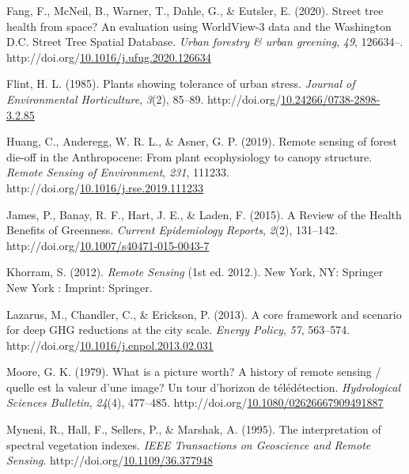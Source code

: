 \documentclass[12pt,twoside]{reedthesis}
\newlength{\cslhangindent}
\newenvironment{CSLReferences}[2] %
 {%
  \setlength{\parindent}{0pt}
  \ifodd #1 \everypar{\setlength{\hangindent}{\cslhangindent}}\ignorespaces\fi
  \ifnum #2 > 0
  \setlength{\parskip}{#2\baselineskip}
  \fi
 }%
 {}
\begin{document}
\begin{CSLReferences}{1}{0}
\leavevmode{}%
Fang, F., McNeil, B., Warner, T., Dahle, G., \& Eutsler, E. (2020). Street tree health from space? An evaluation using WorldView-3 data and the Washington D.C. Street Tree Spatial Database. \emph{Urban forestry \& urban greening}, \emph{49}, 126634--. http://doi.org/\href{https://doi.org/10.1016/j.ufug.2020.126634}{10.1016/j.ufug.2020.126634}

\leavevmode{}%
Flint, H. L. (1985). Plants showing tolerance of urban stress. \emph{Journal of Environmental Horticulture}, \emph{3}(2), 85--89. http://doi.org/\href{https://doi.org/10.24266/0738-2898-3.2.85}{10.24266/0738-2898-3.2.85}

\leavevmode{}%
Huang, C., Anderegg, W. R. L., \& Asner, G. P. (2019). Remote sensing of forest die-off in the Anthropocene: From plant ecophysiology to canopy structure. \emph{Remote Sensing of Environment}, \emph{231}, 111233. http://doi.org/\href{https://doi.org/10.1016/j.rse.2019.111233}{10.1016/j.rse.2019.111233}

\leavevmode{}%
James, P., Banay, R. F., Hart, J. E., \& Laden, F. (2015). A Review of the Health Benefits of Greenness. \emph{Current Epidemiology Reports}, \emph{2}(2), 131--142. http://doi.org/\href{https://doi.org/10.1007/s40471-015-0043-7}{10.1007/s40471-015-0043-7}

\leavevmode{}%
Khorram, S. (2012). \emph{Remote Sensing} (1st ed. 2012.). New York, NY: Springer New York : Imprint: Springer.

\leavevmode{}%
Lazarus, M., Chandler, C., \& Erickson, P. (2013). A core framework and scenario for deep GHG reductions at the city scale. \emph{Energy Policy}, \emph{57}, 563--574. http://doi.org/\href{https://doi.org/10.1016/j.enpol.2013.02.031}{10.1016/j.enpol.2013.02.031}

\leavevmode{}%
Moore, G. K. (1979). What is a picture worth? A history of remote sensing / quelle est la valeur d'une image? Un tour d'horizon de télédétection. \emph{Hydrological Sciences Bulletin}, \emph{24}(4), 477--485. http://doi.org/\href{https://doi.org/10.1080/02626667909491887}{10.1080/02626667909491887}

\leavevmode{}%
Myneni, R., Hall, F., Sellers, P., \& Marshak, A. (1995). The interpretation of spectral vegetation indexes. \emph{IEEE Transactions on Geoscience and Remote Sensing}. http://doi.org/\href{https://doi.org/10.1109/36.377948}{10.1109/36.377948}


\end{CSLReferences}
\end{document}
